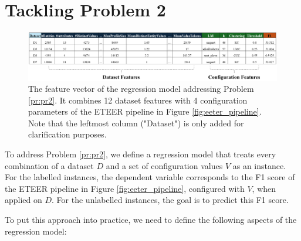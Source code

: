 \section{Tackling Problem 2}
\label{sec:problem-2}

\begin{figure}[t]
    \centering
\includegraphics[width=0.95\linewidth]{figures/dataset/join_dataset_trials.png}
    \caption{The feature vector of the regression model addressing Problem \ref{pr:pr2}. It combines 12 dataset features with 4 configuration parameters of the ETEER pipeline in Figure \ref{fig:eeter_pipeline}. Note that the leftmost column ("Dataset") is only added for clarification  purposes.}
    \label{fig:join_dataset_trials}
\end{figure}

To address Problem \ref{pr:pr2}, we define a regression model that treats every combination of a dataset $D$ and a set of configuration values $V$ as an instance. For the labelled instances, the dependent variable corresponds to the F1 score of the ETEER pipeline in Figure \ref{fig:eeter_pipeline}, configured with $V$, when applied on $D$. For the unlabelled instances, the goal is to predict this F1 score. 

To put this approach into practice, we need to define the following aspects of the regression model:

